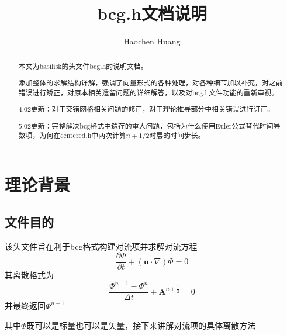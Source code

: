 \documentclass[lang=cn,11pt,a4paper]{elegantpaper}
\title{bcg.h文档说明}
\author{Haochen Huang}
\institute{西安交通大学MFM课题组}
\date{\zhtoday}
\begin{document}
\maketitle
\tableofcontents

\begin{abstract}
本文为basilisk的头文件bcg.h的说明文档。\par
添加整体的求解结构详解，强调了向量形式的各种处理，对各种细节加以补充，对之前错误进行矫正，对原本相关遗留问题的详细解答，以及对bcg.h文件功能的重新审视。\par
4.02更新：对于交错网格相关问题的修正，对于理论推导部分中相关错误进行订正。\par
5.02更新：完整解决bcg格式中遗存的重大问题，包括为什么使用Euler公式替代时间导数项，为何在centered.h中两次计算$n+1/2$时层的时间步长。
\end{abstract}


\section{理论背景}

\subsection{文件目的}
该头文件旨在利于bcg格式构建对流项并求解对流方程
\begin{equation}
    \frac{\partial \Phi}{\partial t} + ( \mathbf{u} \cdot \nabla) \Phi = 0
\end{equation}
其离散格式为
\begin{equation}
    \frac{\Phi^{n+1}-\Phi^{n}}{\Delta t} + \mathbf{A}^{n+ \frac{1}{2}}=0
\end{equation}
并最终返回$\Phi^{n+1}$\par
其中$\Phi$既可以是标量也可以是矢量，接下来讲解对流项的具体离散方法\par
\end{document}
